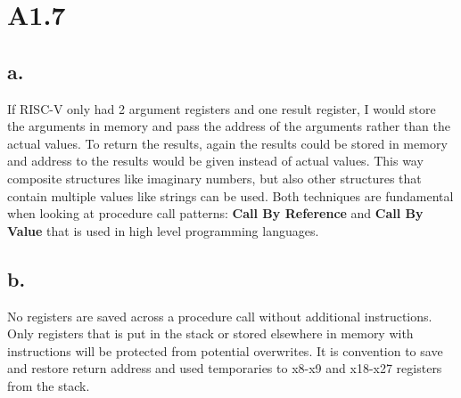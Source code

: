 \section*{A1.7}
\subsection*{a.}
If RISC-V only had 2 argument registers and one result register, I would store the arguments in memory and pass the address of the arguments rather than the actual values.
To return the results, again the results could be stored in memory and address to the results would be given instead of actual values. 
This way composite structures like imaginary numbers, but also other structures that contain multiple values like strings can be used.
Both techniques are fundamental when looking at procedure call patterns: \textbf{Call By Reference} and \textbf{Call By Value} that is used in high level programming languages.

\subsection*{b.}
No registers are saved across a procedure call without additional instructions.
Only registers that is put in the stack or stored elsewhere in memory with instructions will be protected from potential overwrites.
It is convention to save and restore return address and used temporaries to x8-x9 and x18-x27 registers from the stack.